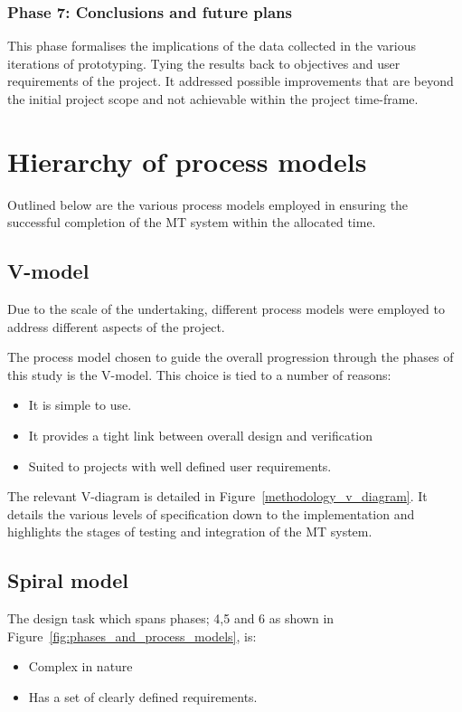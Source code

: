 \subsubsection{Phase 7: Conclusions and future plans}
This phase formalises the implications of the data collected in the various
iterations of prototyping. Tying the results back to objectives and user
requirements of the project.
It addressed possible improvements that are beyond the initial project scope
and not achievable within the project time-frame.

\section{Hierarchy of process models}
Outlined below are the various process models employed in ensuring the
successful completion of the MT system within the allocated time.

\subsection{V-model}
Due to the scale of the undertaking, different process models were employed to
address different aspects of the project.

The process model chosen to guide the overall progression through the phases of
this study is the V-model. This choice is tied to a number of reasons: 
\begin{itemize}
    \item It is simple to use.
    \item It provides a tight link between overall design and verification 
    \item Suited to projects with well defined user requirements.
\end{itemize}

The relevant V-diagram is detailed in Figure~\ref{methodology_v_diagram}. It
details the various levels of specification down to the implementation and
highlights the stages of testing and integration of the MT system.


\subsection{Spiral model}
The design task which spans phases; 4,5 and 6 as shown in Figure~\ref{fig:phases_and_process_models}, is: 
\begin{itemize}
    \item Complex in nature
    \item Has a set of clearly defined requirements. 
\end{itemize}


